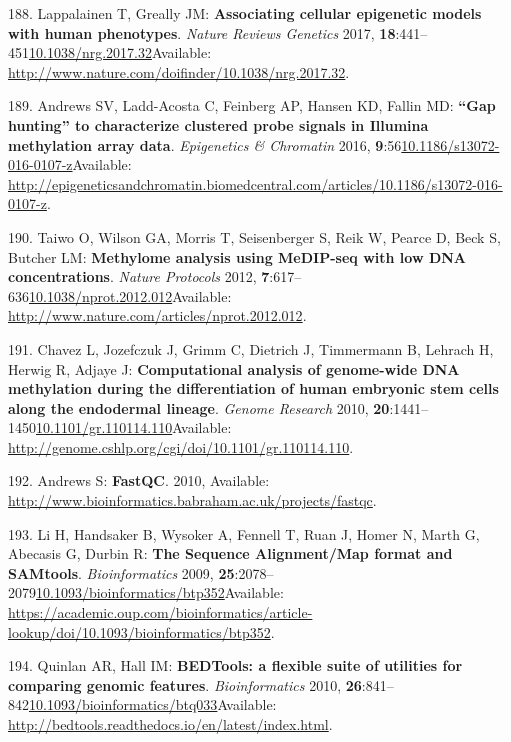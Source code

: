 \documentclass[
]{book}
\begin{document}
\leavevmode\hypertarget{ref-Lappalainen2017}{}%
188. Lappalainen T, Greally JM: \textbf{Associating cellular epigenetic models with human phenotypes}. \emph{Nature Reviews Genetics} 2017, \textbf{18}:441--451\href{https://doi.org/10.1038/nrg.2017.32}{10.1038/nrg.2017.32}Available: \url{http://www.nature.com/doifinder/10.1038/nrg.2017.32}.

\leavevmode\hypertarget{ref-Andrews2016}{}%
189. Andrews SV, Ladd-Acosta C, Feinberg AP, Hansen KD, Fallin MD: \textbf{``Gap hunting'' to characterize clustered probe signals in Illumina methylation array data}. \emph{Epigenetics \& Chromatin} 2016, \textbf{9}:56\href{https://doi.org/10.1186/s13072-016-0107-z}{10.1186/s13072-016-0107-z}Available: \url{http://epigeneticsandchromatin.biomedcentral.com/articles/10.1186/s13072-016-0107-z}.

\leavevmode\hypertarget{ref-Taiwo2012}{}%
190. Taiwo O, Wilson GA, Morris T, Seisenberger S, Reik W, Pearce D, Beck S, Butcher LM: \textbf{Methylome analysis using MeDIP-seq with low DNA concentrations}. \emph{Nature Protocols} 2012, \textbf{7}:617--636\href{https://doi.org/10.1038/nprot.2012.012}{10.1038/nprot.2012.012}Available: \url{http://www.nature.com/articles/nprot.2012.012}.

\leavevmode\hypertarget{ref-Chavez2010}{}%
191. Chavez L, Jozefczuk J, Grimm C, Dietrich J, Timmermann B, Lehrach H, Herwig R, Adjaye J: \textbf{Computational analysis of genome-wide DNA methylation during the differentiation of human embryonic stem cells along the endodermal lineage}. \emph{Genome Research} 2010, \textbf{20}:1441--1450\href{https://doi.org/10.1101/gr.110114.110}{10.1101/gr.110114.110}Available: \url{http://genome.cshlp.org/cgi/doi/10.1101/gr.110114.110}.

\leavevmode\hypertarget{ref-Andrews2010}{}%
192. Andrews S: \textbf{FastQC}. 2010, Available: \url{http://www.bioinformatics.babraham.ac.uk/projects/fastqc}.

\leavevmode\hypertarget{ref-Li2009b}{}%
193. Li H, Handsaker B, Wysoker A, Fennell T, Ruan J, Homer N, Marth G, Abecasis G, Durbin R: \textbf{The Sequence Alignment/Map format and SAMtools}. \emph{Bioinformatics} 2009, \textbf{25}:2078--2079\href{https://doi.org/10.1093/bioinformatics/btp352}{10.1093/bioinformatics/btp352}Available: \url{https://academic.oup.com/bioinformatics/article-lookup/doi/10.1093/bioinformatics/btp352}.

\leavevmode\hypertarget{ref-Quinlan2010}{}%
194. Quinlan AR, Hall IM: \textbf{BEDTools: a flexible suite of utilities for comparing genomic features}. \emph{Bioinformatics} 2010, \textbf{26}:841--842\href{https://doi.org/10.1093/bioinformatics/btq033}{10.1093/bioinformatics/btq033}Available: \url{http://bedtools.readthedocs.io/en/latest/index.html}.
\end{document}
